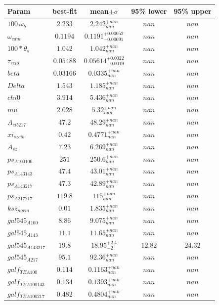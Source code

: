 \begin{tabular}{|l|c|c|c|c|} 
 \hline 
Param & best-fit & mean$\pm\sigma$ & 95\% lower & 95\% upper \\ \hline 
$100~\omega{}_{b }$ &$2.233$ & $2.242_{nan}^{+nan}$ & $nan$ & $nan$ \\ 
$\omega{}_{cdm }$ &$0.1194$ & $0.1191_{-0.00091}^{+0.00052}$ & $nan$ & $nan$ \\ 
$100*\theta{}_{s }$ &$1.042$ & $1.042_{nan}^{+nan}$ & $nan$ & $nan$ \\ 
$\tau{}_{reio }$ &$0.05488$ & $0.05614_{-0.0019}^{+0.0022}$ & $nan$ & $nan$ \\ 
$beta$ &$0.03166$ & $0.0335_{nan}^{+nan}$ & $nan$ & $nan$ \\ 
$Delta$ &$1.543$ & $1.185_{nan}^{+nan}$ & $nan$ & $nan$ \\ 
$chi0$ &$3.914$ & $5.436_{nan}^{+nan}$ & $nan$ & $nan$ \\ 
$mu$ &$2.028$ & $5.32_{nan}^{+nan}$ & $nan$ & $nan$ \\ 
$A_{cib 217 }$ &$47.2$ & $48.29_{nan}^{+nan}$ & $nan$ & $nan$ \\ 
$xi_{sz cib }$ &$0.42$ & $0.4771_{nan}^{+nan}$ & $nan$ & $nan$ \\ 
$A_{sz }$ &$7.23$ & $6.269_{nan}^{+nan}$ & $nan$ & $nan$ \\ 
$ps_{A 100 100 }$ &$251$ & $250.6_{nan}^{+nan}$ & $nan$ & $nan$ \\ 
$ps_{A 143 143 }$ &$47.4$ & $43.01_{nan}^{+nan}$ & $nan$ & $nan$ \\ 
$ps_{A 143 217 }$ &$47.3$ & $42.89_{nan}^{+nan}$ & $nan$ & $nan$ \\ 
$ps_{A 217 217 }$ &$119.8$ & $115_{nan}^{+nan}$ & $nan$ & $nan$ \\ 
$ksz_{norm }$ &$0.01$ & $1.835_{nan}^{+nan}$ & $nan$ & $nan$ \\ 
$gal545_{A 100 }$ &$8.86$ & $9.075_{nan}^{+nan}$ & $nan$ & $nan$ \\ 
$gal545_{A 143 }$ &$11.1$ & $11.65_{nan}^{+nan}$ & $nan$ & $nan$ \\ 
$gal545_{A 143 217 }$ &$19.8$ & $18.95_{-2}^{+2.4}$ & $12.82$ & $24.32$ \\ 
$gal545_{A 217 }$ &$95.1$ & $92.36_{nan}^{+nan}$ & $nan$ & $nan$ \\ 
$galf_{TE A 100 }$ &$0.114$ & $0.1163_{nan}^{+nan}$ & $nan$ & $nan$ \\ 
$galf_{TE A 100 143 }$ &$0.134$ & $0.1393_{nan}^{+nan}$ & $nan$ & $nan$ \\ 
$galf_{TE A 100 217 }$ &$0.482$ & $0.4804_{nan}^{+nan}$ & $nan$ & $nan$ \\ 

\end{tabular}
